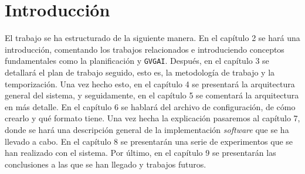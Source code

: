 
\chapter{Introducción}

El trabajo se ha estructurado de la siguiente manera. En el capítulo 2 se hará
una introducción, comentando los trabajos relacionados e introduciendo conceptos
fundamentales como la planificación y \texttt{GVGAI}. Después, en el capítulo 3 se
detallará el plan de trabajo seguido, esto es, la metodología de trabajo y la
temporización. Una vez hecho esto, en el capítulo 4 se presentará la arquitectura
general del sistema, y seguidamente, en el capítulo 5 se comentará la arquitectura
en más detalle. En el capítulo 6 se hablará del archivo de configuración, de cómo
crearlo y qué formato tiene. Una vez hecha la explicación pasaremos al capítulo 7,
donde se hará una descripción general de la implementación \textit{software} que se
ha llevado a cabo. En el capítulo 8 se presentarán una serie de experimentos que
se han realizado con el sistema. Por último, en el capítulo 9 se presentarán las
conclusiones a las que se han llegado y trabajos futuros.